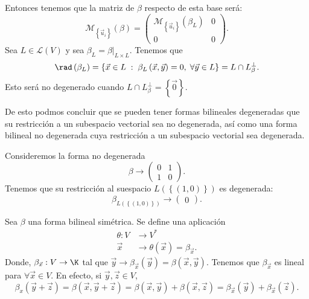 Entonces tenemos que la matriz de $\displaystyle \beta  $ respecto de esta base será:
\[\mathcal{M}_{ \left\{ \vec{u}_{i}\right\} }\left(\beta \right) = \begin{pmatrix} \mathcal{M}_{ \left\{ \vec{u}_{i}\right\} }\left(\beta _{L}\right) & 0 \\
0 & 0\end{pmatrix} .\]
Sea $\displaystyle L \in \mathcal{L}\left(V\right) $ y sea $\displaystyle \beta_{L} = \beta|_{L \times L} $. Tenemos que 
\[ \rad\left(\beta_{L}\right) = \left\{ \vec{x} \in L \; : \; \beta_{L}\left(\vec{x}, \vec{y}\right) = 0, \; \forall \vec{y} \in L\right\} = L \cap L^{\perp }_{\beta} .\]
Esto será no degenerado cuando $\displaystyle L \cap L^{\perp }_{\beta }= \left\{ \vec{0}\right\}  $.
\begin{observation}
\normalfont De esto podmos concluir que se pueden tener formas bilineales degeneradas que su restricción a un subespacio vectorial sea no degenerada, así como una forma bilineal no degenerada cuya restricción a un subespacio vectorial sea degenerada.
\end{observation}
\begin{eg}
\normalfont Consideremos la forma no degenerada
\[\beta \to \begin{pmatrix} 0 & 1 \\ 1 & 0 \end{pmatrix} .\]
Tenemos que su restricción al suespacio $\displaystyle L\left( \left\{ \left(1,0\right)\right\} \right) $ es degenerada:
\[ \beta_{L \left( \left\{ \left(1,0\right)\right\} \right)} \to \begin{pmatrix} 0 \end{pmatrix} .\]
\end{eg}
Sea $\displaystyle \beta  $ una forma bilineal simétrica. Se define una aplicación
\[
\begin{split}
	\theta : V & \to V^{*} \\
	\vec{x} & \to \theta\left(\vec{x}\right) = \beta_{\vec{x}}.
\end{split}
\]
Donde, $\displaystyle \beta_{\vec{x}} : V \to \K  $ tal que $\displaystyle \vec{y} \to \beta_{\vec{x}}\left(\vec{y}\right) = \beta\left(\vec{x}, \vec{y}\right) $. Tenemos que $\displaystyle \beta_{\vec{x}} $ es lineal para $\displaystyle \forall \vec{x} \in V $. En efecto, si $\displaystyle \vec{y}, \vec{z} \in V $,
\[ \beta_{x}\left(\vec{y} + \vec{z}\right) = \beta\left(\vec{x}, \vec{y} + \vec{z}\right) = \beta\left(\vec{x}, \vec{y}\right) + \beta\left(\vec{x}, \vec{z}\right) = \beta_{\vec{x}}\left(\vec{y}\right) + \beta_{\vec{x}}\left(\vec{z}\right) .\]

